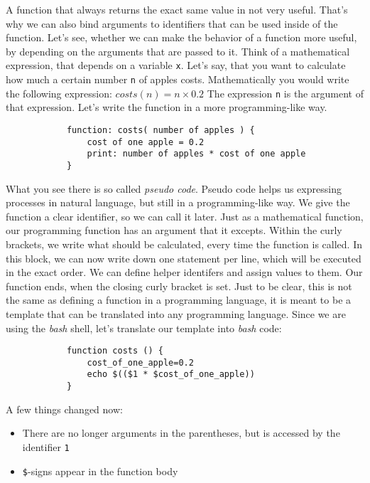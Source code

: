 \begin{challenge}
    \begin{task}
        A function that always returns the exact same value in not very useful.
        That's why we can also bind arguments to identifiers that can be used inside of the function.
        Let's see, whether we can make the behavior of a function more useful, by depending on the arguments that are passed to it.
        Think of a mathematical expression, that depends on a variable \texttt{x}.
        Let's say, that you want to calculate how much a certain number \texttt{n} of apples costs.
        Mathematically you would write the following expression:
        \( costs (n) = n \times 0.2 \)
        The expression \texttt{n} is the argument of that expression.
        Let's write the function in a more programming-like way.
        \begin{lstlisting}
            function: costs( number of apples ) {
                cost of one apple = 0.2
                print: number of apples * cost of one apple
            }
        \end{lstlisting}
        What you see there is so called \textit{pseudo code}.
        Pseudo code helps us expressing processes in natural language, but still in a programming-like way.
        We give the function a clear identifier, so we can call it later. 
        Just as a mathematical function, our programming function has an argument that it excepts.
        Within the curly brackets, we write what should be calculated, every time the function is called.
        In this block, we can now write down one statement per line, which will be executed in the exact order.
        We can define helper identifers and assign values to them.
        Our function ends, when the closing curly bracket is set.
        Just to be clear, this is not the same as defining a function in a programming language, it is meant to be a template that can be translated into any programming language. 
        Since we are using the \textit{bash} shell, let's translate our template into \textit{bash} code:
        \begin{lstlisting}
            function costs () {
                cost_of_one_apple=0.2
                echo $(($1 * $cost_of_one_apple))
            }   
        \end{lstlisting}
        A few things changed now:
        \begin{itemize}
            \item There are no longer arguments in the parentheses, but is accessed by the identifier \texttt{1}
            \item \texttt{\$}-signs appear in the function body

\end{itemize}
\end{task}
\end{challenge}
